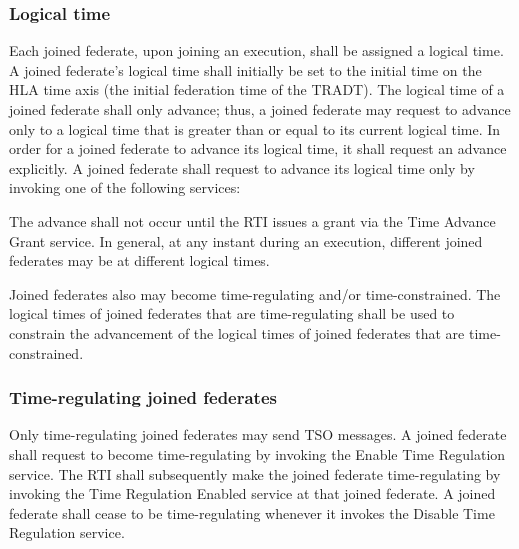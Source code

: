 \begin{compactstdpage}

    \subsubsection{Logical time}

    Each joined federate, upon joining an execution, shall be assigned a logical time. A joined federate's logical time shall initially be set to the initial time on the HLA time axis (the initial federation time of the TRADT). The logical time of a joined federate shall only advance; thus, a joined federate may request to advance only to a logical time that is greater than or equal to its current logical time. In order for a joined federate to advance its logical time, it shall request an advance explicitly. A joined federate shall request to advance its logical time only by invoking one of the following services:


    The advance shall not occur until the RTI issues a grant via the Time Advance Grant \rtiinitiated{} service. In general, at any instant during an execution, different joined federates may be at different logical times.

    Joined federates also may become time-regulating and/or time-constrained. The logical times of joined federates that are time-regulating shall be used to constrain the advancement of the logical times of joined federates that are time-constrained.

    \subsubsection{Time-regulating joined federates}

    Only time-regulating joined federates may send TSO messages. A joined federate shall request to become time-regulating by invoking the Enable Time Regulation service. The RTI shall subsequently make the joined federate time-regulating by invoking the Time Regulation Enabled \rtiinitiated{} service at that joined federate. A joined federate shall cease to be time-regulating whenever it invokes the Disable Time Regulation service.


\end{compactstdpage}
